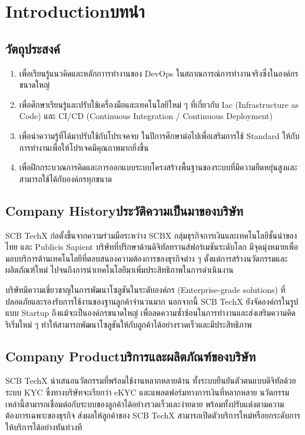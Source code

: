 \chapter{\ifenglish Introduction\else บทนำ\fi}

\section{วัตถุประสงค์}
\begin{enumerate}
    \item เพื่อเรียนรู้แนวคิดและหลักกาารทำงานของ DevOps ในสถาณการณ์การทำงานจริงซึ่งในองค์กรขนาดใหญ่
    \item เพื่อศึกษาเรียนรู้และปรับใช้เครื่องมือและเทคโนโลยีใหม่ ๆ ที่เกี่ยวกับ Iac (Infrastructure as Code) และ CI/CD (Continuous Integration / Continuous Deployment)
    \item เพื่อนำความรู้ที่ได้มาปรับใช้กับโปรเจคจบ ในปีการศึกษาต่อไปเพื่อเสริมการใช้ Standard ให้กับการทำงานเพื่อให้โปรเจคมีคุณภาพมากยิ่งขึ้น
    \item เพื่อฝึกกระบวณการคิดและการออกแบบระบบโครงสร้างพื้นฐานของระบบที่มีความยืดหยุ่นสูงและสามารถใช้ได้กับองค์กรทุกขนาด

\end{enumerate}

\section{\ifenglish Company History\else ประวัติความเป็นมาของบริษัท\fi}

SCB TechX \cite{techxWebsite} ก่อตั้งขึ้นจากความร่วมมือระหว่าง SCBX กลุ่มธุรกิจการเงินและเทคโนโลยีชั้นนำของไทย และ Publicis Sapient บริษัทที่ปรึกษาด้านดิจิทัลทรานส์ฟอร์เมชันระดับโลก มีจุดมุ่งหมายเพื่อมอบบริการด้านเทคโนโลยีที่ตอบสนองความต้องการของธุรกิจต่าง ๆ ตั้งแต่การสร้างนวัตกรรมและผลิตภัณฑ์ใหม่ ไปจนถึงการนำเทคโนโลยีมาเพิ่มประสิทธิภาพในการดำเนินงาน

บริษัทมีความเชี่ยวชาญในการพัฒนาโซลูชันในระดับองค์กร (Enterprise-grade solutions) ที่ปลอดภัยและรองรับการใช้งานของฐานลูกค้าจำนวนมาก นอกจากนี้ SCB TechX ยังจัดองค์กรในรูปแบบ Startup ถึงแม้จะเป็นองค์กรขนาดใหญ่ เพื่อลดความซ้ำซ้อนในการทำงานและส่งเสริมความคิดริเริ่มใหม่ ๆ ทำให้สามารถพัฒนาโซลูชันให้กับลูกค้าได้อย่างรวดเร็วและมีประสิทธิภาพ


\section{\ifenglish Company Product\else บริการและผลิตภัณฑ์ของบริษัท\fi}
SCB TechX นำเสนอนวัตกรรมที่พร้อมใช้งานหลากหลายด้าน \cite{techxProduct} ทั้งระบบยืนยันตัวตนแบบดิจิทัลด้วยระบบ KYC \cite{whatIsKYC} ซึ่งทางบริษัทจะเรียกว่า eKYC และแพลตฟอร์มทางการเงินที่หลากหลาย นวัตกรรมเหล่านี้สามารถเชื่อมต่อกับระบบของลูกค้าได้อย่างรวดเร็วและง่ายดาย พร้อมทั้งปรับแต่งตามความต้องการเฉพาะของธุรกิจ ส่งผลให้ลูกค้าของ SCB TechX สามารถเปิดตัวบริการใหม่หรือยกระดับการให้บริการได้อย่างทันท่วงที

